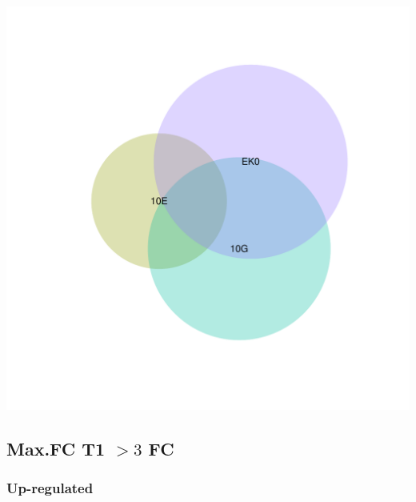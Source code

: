 \documentclass{article}\usepackage[]{graphicx}\usepackage[]{color}
\newenvironment{knitrout}{}{} %
\begin{document}
\begin{knitrout}
\color{fgcolor}

{\centering \includegraphics[width=1\linewidth,height=.4\textheight]{figure/minimal-venn_alltimes_3fc_down_euler-1} 

}



\end{knitrout}
\clearpage

\subsection{Max.FC T1 $>3$ FC}
\subsubsection{Up-regulated}
\end{document}

